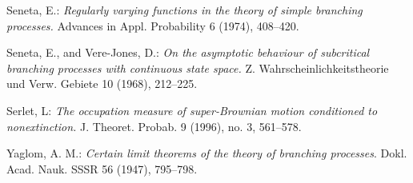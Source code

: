 \documentclass[12pt,a4paper]{amsart}
\numberwithin{equation}{section}
\theoremstyle{plain}
\theoremstyle{definition}
\theoremstyle{remark}
\begin{document}
\begin{thebibliography}{99}
	Seneta, E.:
	\emph{Regularly varying functions in the theory of simple branching processes.}
	Advances in Appl. Probability 6 (1974), 
	408--420.
	
	Seneta, E., and Vere-Jones, D.:
	\emph{On the asymptotic behaviour of subcritical branching processes with continuous state space.}
	Z. Wahrscheinlichkeitstheorie und Verw. Gebiete 10 (1968), 
	212--225.
	
	Serlet, L:
	\emph{The occupation measure of super-Brownian motion conditioned to nonextinction.}
	J. Theoret. Probab. 9 (1996), no. 3, 
	561--578.

	Yaglom, A. M.: \emph{Certain limit theorems of the theory of branching processes}. Dokl. Acad.
	Nauk. SSSR 56 (1947), 795--798.

\end{thebibliography}
\end{document}
